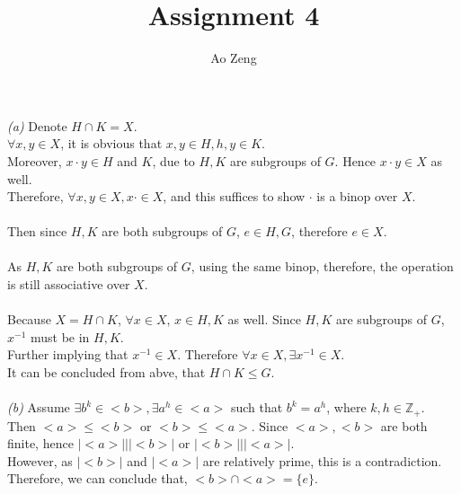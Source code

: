 \documentclass[11pt]{article}
\newcommand{\abs}[1]{\lvert #1 \rvert}
\newenvironment{problem}[2][Problem]{\begin{trivlist}
\item[\hskip \labelsep {\bfseries #1}\hskip \labelsep {\bfseries #2.}]}{\end{trivlist}}
\begin{document}
\title{Assignment 4}
\author{Ao Zeng}
\maketitle
\begin{problem}{(1)}
\textit{(a)} Denote $H \cap K = X$.\\
$\forall x,y \in X$, it is obvious that $x,y\in H, h,y\in K$.\\
Moreover, $x\cdot y \in H$ and $K$, due to $H,K$ are subgroups of $G$. Hence $x\cdot y \in X$ as well.\\
Therefore, $\forall x,y \in X, x\cdot \in X$, and this suffices to show $\cdot $ is a binop over $X$.\\
\\
Then since $H, K$ are both subgroups of $G$, $e \in H,G$, therefore $e \in X$.\\
\\
As $H, K$ are both subgroups of $G$, using the same binop, therefore, the operation is still associative
over $X$.\\
\\
Because $X = H \cap K$, $\forall x \in X$, $x \in H,K$ as well. Since $H,K$ are subgroups of $G$, $x^{-1}$ must be in $H, K$.\\
Further implying that $x^{-1} \in X$. Therefore $\forall x\in X, \exists x^{-1} \in X$.
\\
It can be concluded from abve, that $H\cap K \leq G$.\\
\\
\textit{(b)} Assume $\exists b^k \in <b>, \exists a^h \in <a>$ such that $ b^k = a^h$, where $k,h \in \mathbb{Z}_+$.\\
Then $<a> \leq <b>$ or $<b>\leq <a>$. Since $<a>, <b>$ are both finite, hence $\abs{<a>} | \abs{<b>}$ or $\abs{<b>} | \abs{<a>}$.\\
However, as $\abs{<b>}$ and $\abs{<a>}$ are relatively prime, this is a contradiction.\\
Therefore, we can conclude that, $<b> \cap <a> = \{ e \}$.
\end{problem}
\end{document}

